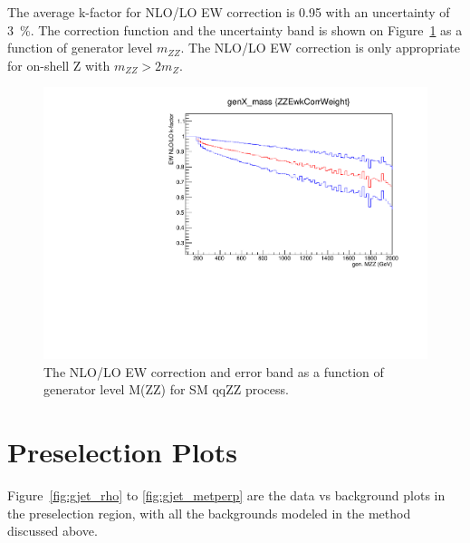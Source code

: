\vspace{0.3cm}
The average k-factor for NLO/LO EW correction is 0.95 with an uncertainty of 3~\%. 
The correction function and the uncertainty band is shown on Figure~\ref{fig:qqzz_nlo_ew}
as a function of generator level $m_{ZZ}$. 
The NLO/LO EW correction is only appropriate for on-shell Z with $m_{ZZ}>2 m_{Z}$. 

\begin{figure}[htbp!]
\centering
  \includegraphics[width=0.48\linewidth]{figures/ewkfactor.pdf}
  \caption{The NLO/LO EW correction and error band as a function of generator level M(ZZ) for SM qqZZ process.}
  \label{fig:qqzz_nlo_ew}
\end{figure}

\clearpage
\section{Preselection Plots}
Figure~\ref{fig:gjet_rho} to \ref{fig:gjet_metperp} are the data vs background plots in the preselection region, with all the backgrounds modeled in the method discussed above. 

